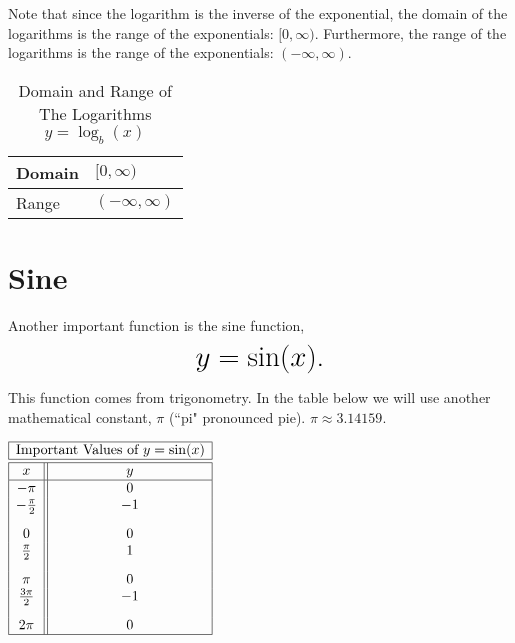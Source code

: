 \documentclass[nooutcomes]{ximera}
\begin{document}
Note that since the logarithm is the inverse of the exponential, the domain of the logarithms is the range of the exponentials: $[0, \infty)$. Furthermore, the range of the logarithms is the range of the exponentials: $(-\infty, \infty)$. 

\begin{table}[h]
\caption{\label{tab:logdr}Domain and Range of The Logarithms $y = \log_b(x)$}
\centering
\begin{tabular}{l|l}
Domain & $[0, \infty)$ \\ \hline
Range & $(-\infty, \infty)$
\end{tabular}
\end{table}

\newpage


\section{Sine}
Another important function is the sine function, $$ \mbox{\huge $y=\sin(x)$.}$$ 


This function comes from trigonometry. In the table below we will use another mathematical constant, $\pi$ (``pi" pronounced pie). $\pi \approx 3.14159$.

\begin{image}
\end{image}

\begin{center}
\(
\begin{array}{ |c || c|  }
 \hline
 \multicolumn{2}{|c|}{\text{\normalfont Important Values of } y=\sin(x)} \\
\hline
 \hline
 x & y\\
 \hline

 -\pi&0\\

 -\frac{\pi}{2}&-1\\[2ex]

 0&0\\

 \frac{\pi}{2}&1\\[2ex]

 \pi&0\\

\frac{3\pi}{2}&-1\\[2ex]

 2 \pi&0\\
\hline
\end{array}
\)
\end{center}
\end{document}
